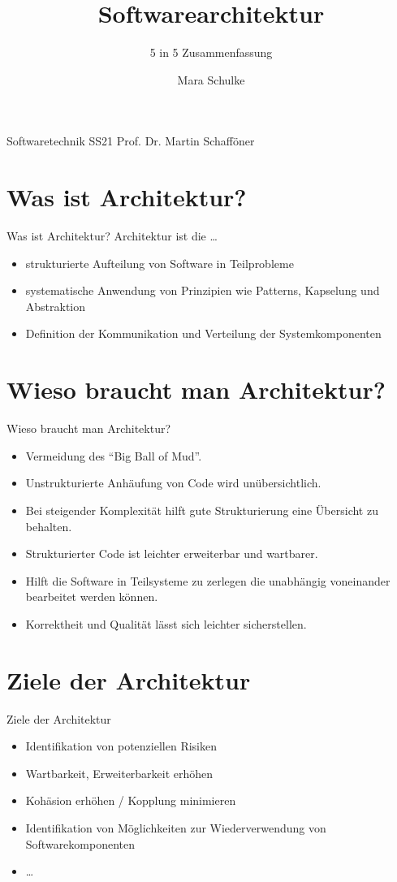 \documentclass{beamer}
\title{Softwarearchitektur}
\subtitle{5 in 5 Zusammenfassung}
\author{Mara Schulke}
\begin{document}
\begin{frame}
	Softwaretechnik \hfill SS21
	\titlepage
	Prof. Dr. Martin Schafföner
\end{frame}

\section{Was ist Architektur?}

\begin{frame}{Was ist Architektur?}
	Architektur ist die \dots
	\begin{itemize}
		\item{strukturierte Aufteilung von Software in Teilprobleme}
		\item{systematische Anwendung von Prinzipien wie Patterns, Kapselung und
			Abstraktion}
		\item{Definition der Kommunikation und Verteilung der
			Systemkomponenten}
	\end{itemize}
\end{frame}

\section{Wieso braucht man Architektur?}

\begin{frame}{Wieso braucht man Architektur?}
	\begin{itemize}
		\item{Vermeidung des ``Big Ball of Mud''.}
		\item{Unstrukturierte Anhäufung von Code wird unübersichtlich.}
		\item{Bei steigender Komplexität hilft gute Strukturierung eine
			Übersicht zu behalten.}
		\item{Strukturierter Code ist leichter erweiterbar und wartbarer.}
		\item{Hilft die Software in Teilsysteme zu zerlegen die unabhängig
			voneinander bearbeitet werden können.}
		\item{Korrektheit und Qualität lässt sich leichter sicherstellen.}
	\end{itemize}
\end{frame}

\section{Ziele der Architektur}

\begin{frame}{Ziele der Architektur}
	\begin{itemize}
		\item{Identifikation von potenziellen Risiken}
		\item{Wartbarkeit, Erweiterbarkeit erhöhen}
		\item{Kohäsion erhöhen / Kopplung minimieren}
		\item{Identifikation von Möglichkeiten zur Wiederverwendung von
			Softwarekomponenten}
		\item{\dots}
	\end{itemize}
\end{frame}
\end{document}
